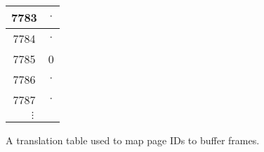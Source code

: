 \begin{frame}
{\begin{figure}[ht!]
\begin{adjustbox}{width = \textwidth}
\begin{tabular}{cc}
				\multicolumn{1}{|c|}{7783}		& \multicolumn{1}{c|}{$\cdot$} 		\\ 	\hline
				\multicolumn{1}{|c|}{7784}		& \multicolumn{1}{c|}{$\cdot$} 		\\ 	\hline
				\multicolumn{1}{|c|}{7785}		& \multicolumn{1}{c|}{0}       		\\ 	\hline
				\multicolumn{1}{|c|}{7786}		& \multicolumn{1}{c|}{$\cdot$} 		\\ 	\hline
				\multicolumn{1}{|c|}{7787}		& \multicolumn{1}{c|}{$\cdot$} 		\\ 	\hline
				\multicolumn{2}{c}{$\vdots$}                                  
			\end{tabular}
		\end{adjustbox}
		\caption{A translation table used to map page IDs to buffer frames.}
	\end{figure}}

\end{frame}

